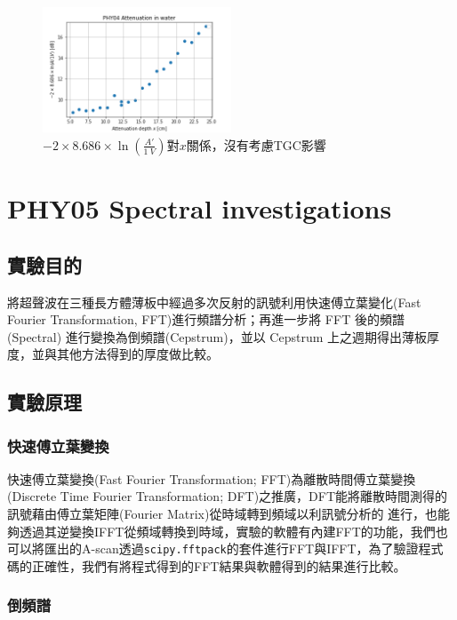 \documentclass[12pt]{report}
\begin{document}
\begin{figure}[htbp]
    \centering
    \includegraphics[width=0.5\textwidth]{noTGC.png}
    \caption{$-2\times 8.686 \times \ln\left(\frac{A'}{\SI{1}{V}}\right)$對$x$關係，沒有考慮TGC影響}
    \label{notgc}
\end{figure}

\chapter{PHY05 Spectral investigations}\label{PHY05}

\section{實驗目的}

將超聲波在三種長方體薄板中經過多次反射的訊號利用快速傅立葉變化(Fast Fourier Transformation, FFT)進行頻譜分析；再進一步將 FFT 後的頻譜 (Spectral) 進行變換為倒頻譜(Cepstrum)，並以 Cepstrum 上之週期得出薄板厚度，並與其他方法得到的厚度做比較。

\section{實驗原理}

\subsection{快速傅立葉變換}

快速傅立葉變換(Fast Fourier Transformation; FFT)為離散時間傅立葉變換(Discrete Time Fourier Transformation; DFT)之推廣，DFT能將離散時間測得的訊號藉由傅立葉矩陣(Fourier Matrix)從時域轉到頻域以利訊號分析的
進行，也能夠透過其逆變換IFFT從頻域轉換到時域，實驗的軟體有內建FFT的功能，我們也可以將匯出的A-scan透過\verb|scipy.fftpack|的套件進行FFT與IFFT，為了驗證程式碼的正確性，我們有將程式得到的FFT結果與軟體得到的結果進行比較。

\subsection{倒頻譜}
\end{document}

